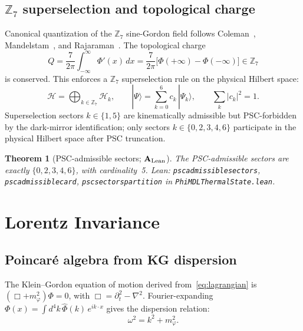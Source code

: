 \documentclass[11pt]{article}
\newtheorem{theorem}{Theorem}[section]
\theoremstyle{remark}
\newcommand{\ZS}{\mathbb{Z}_7}
\newcommand{\lean}[1]{%
  \penalty-100
  \begingroup\def\_{\textunderscore\allowbreak}\texttt{#1}\endgroup}
\newcommand{\CatAL}{\ensuremath{\textbf{A}_{\rm Lean}}}
\begin{document}
\subsection{$\ZS$ superselection and topological charge}
\label{ssec:supersel}

Canonical quantization of the $\ZS$ sine-Gordon field follows
Coleman~\cite{Coleman1975}, Mandelstam~\cite{Mandelstam1975}, and
Rajaraman~\cite{Rajaraman1982}.  The topological charge
\begin{equation}
  Q = \frac{7}{2\pi}\int_{-\infty}^{\infty}\Phi'(x)\,dx
  = \frac{7}{2\pi}\bigl[\Phi(+\infty)-\Phi(-\infty)\bigr] \in \ZS
\end{equation}
is conserved.  This enforces a $\ZS$ superselection rule on the physical
Hilbert space:
\begin{equation}
  \mathcal{H} = \bigoplus_{k\in\ZS}\mathcal{H}_k,
  \qquad
  |\Psi\rangle = \sum_{k=0}^{6} c_k\,|\Psi_k\rangle,
  \qquad \sum_k|c_k|^2 = 1.
\end{equation}
Superselection sectors $k\in\{1,5\}$ are kinematically admissible but
PSC-forbidden by the dark-mirror identification; only sectors $k\in\{0,2,3,4,6\}$
participate in the physical Hilbert space after PSC truncation.

\begin{theorem}[PSC-admissible sectors; $\CatAL$]
  \label{thm:psc_sectors}
  The PSC-admissible sectors are exactly $\{0,2,3,4,6\}$, with cardinality~5.
  Lean: \lean{psc\_admissible\_sectors}, \lean{psc\_admissible\_card},
  \lean{psc\_sectors\_partition} in \lean{PhiMDLThermalState.lean}.
\end{theorem}

\section{Lorentz Invariance}
\label{sec:lorentz}

\subsection{Poincaré algebra from KG dispersion}
\label{ssec:poincare}

The Klein--Gordon equation of motion derived from~\eqref{eq:lagrangian}
is $(\Box + m_\varphi^2)\Phi = 0$, with $\Box = \partial_t^2 - \nabla^2$.
Fourier-expanding $\Phi(x)=\int d^4k\,\hat\Phi(k)\,e^{ik\cdot x}$ gives
the dispersion relation:
\begin{equation}
  \omega^2 = k^2 + m_\varphi^2.
  \label{eq:dispersion}
\end{equation}
\end{document}
